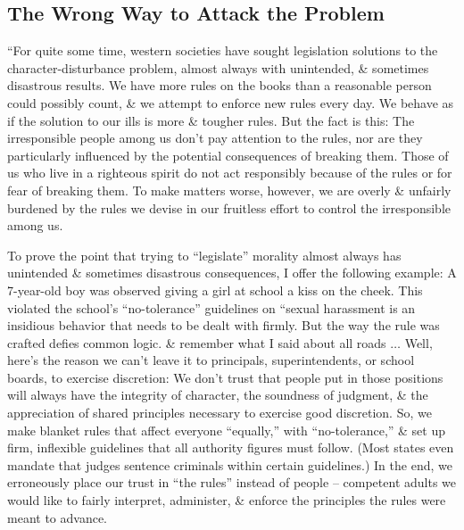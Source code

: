 \documentclass{article}
\numberwithin{equation}{section}
\begin{document}
\subsection{The Wrong Way to Attack the Problem}
``For quite some time, western societies have sought legislation solutions to the character-disturbance problem, almost always with unintended, \& sometimes disastrous results. We have more rules on the books than a reasonable person could possibly count, \& we attempt to enforce new rules every day. We behave as if the solution to our ills is more \& tougher rules. But the fact is this: The irresponsible people among us don't pay attention to the rules, nor are they particularly influenced by the potential consequences of breaking them. Those of us who live in a righteous spirit do not act responsibly because of the rules or for fear of breaking them. To make matters worse, however, we are overly \& unfairly burdened by the rules we devise in our fruitless effort to control the irresponsible among us.

To prove the point that trying to ``legislate'' morality almost always has unintended \& sometimes disastrous consequences, I offer the following example: A 7-year-old boy was observed giving a girl at school a kiss on the cheek. This violated the school's ``no-tolerance'' guidelines on ``sexual harassment is an insidious behavior that needs to be dealt with firmly. But the way the rule was crafted defies common logic. \& remember what I said about all roads $\ldots$ Well, here's the reason we can't leave it to principals, superintendents, or school boards, to exercise discretion: We don't trust that people put in those positions will always have the integrity of character, the soundness of judgment, \& the appreciation of shared principles necessary to exercise good discretion. So, we make blanket rules that affect everyone ``equally,'' with ``no-tolerance,'' \& set up firm, inflexible guidelines that all authority figures must follow. (Most states even mandate that judges sentence criminals within certain guidelines.) In the end, we erroneously place our trust in ``the rules'' instead of people -- competent adults we would like to fairly interpret, administer, \& enforce the principles the rules were meant to advance.
\end{document}
